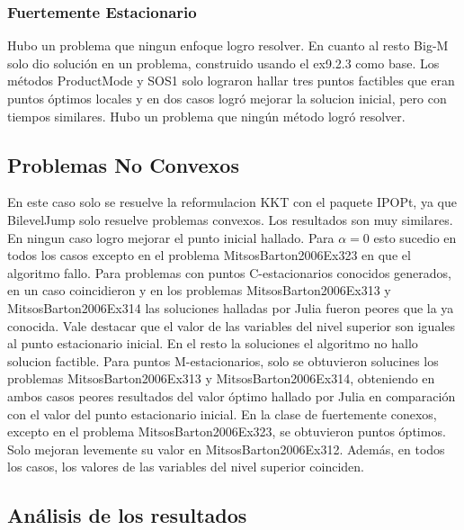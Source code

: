 \subsubsection{Fuertemente Estacionario} 
Hubo un problema que ningun enfoque logro resolver. En cuanto al resto  Big-M solo dio solución en un problema, construido usando el ex9.2.3 como base. Los métodos ProductMode y SOS1 solo lograron hallar tres puntos factibles que eran puntos óptimos locales y en dos casos logró mejorar la solucion inicial, pero con tiempos similares. Hubo un problema que ningún método logró resolver.


\subsection{Problemas No Convexos}

En este caso solo se resuelve  la reformulacion KKT con el paquete IPOPt, ya que BilevelJump solo resuelve problemas convexos. Los resultados son muy similares. En ningun caso logro mejorar el punto inicial hallado. Para $\alpha =0$ esto sucedio en todos los casos excepto en el problema MitsosBarton2006Ex323 en que el algoritmo fallo. Para  problemas con puntos C-estacionarios conocidos generados,  en un caso coincidieron y en  los problemas MitsosBarton2006Ex313 y MitsosBarton2006Ex314 las soluciones halladas por Julia fueron peores que la ya conocida. Vale destacar que el valor de las variables del nivel superior son iguales al punto estacionario inicial. En el resto la soluciones el algoritmo no hallo solucion factible.   Para puntos M-estacionarios, solo se obtuvieron solucines los problemas MitsosBarton2006Ex313 y MitsosBarton2006Ex314, obteniendo en ambos casos peores resultados del valor óptimo hallado por Julia en comparación con el valor del punto estacionario inicial. En la clase de fuertemente conexos, excepto en el problema MitsosBarton2006Ex323,
 se obtuvieron puntos óptimos. Solo mejoran levemente su valor en MitsosBarton2006Ex312. 
 Además, en todos los casos, los valores de las variables del nivel superior coinciden.
     

    




  


\subsection{Análisis de los resultados}


